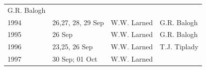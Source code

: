 \documentclass[]{article}
\begin{document}
\begin{longtable}[]{@{}llll@{}}
\begin{minipage}[t]{0.20\columnwidth}
G.R. Balogh\strut
\end{minipage}\tabularnewline
\begin{minipage}[t]{0.12\columnwidth}\raggedright\strut
1994\strut
\end{minipage} & \begin{minipage}[t]{0.38\columnwidth}\raggedright\strut
26,27, 28, 29 Sep\strut
\end{minipage} & \begin{minipage}[t]{0.18\columnwidth}\raggedright\strut
W.W. Larned\strut
\end{minipage} & \begin{minipage}[t]{0.20\columnwidth}\raggedright\strut
G.R. Balogh\strut
\end{minipage}\tabularnewline
\begin{minipage}[t]{0.12\columnwidth}\raggedright\strut
1995\strut
\end{minipage} & \begin{minipage}[t]{0.38\columnwidth}\raggedright\strut
26 Sep\strut
\end{minipage} & \begin{minipage}[t]{0.18\columnwidth}\raggedright\strut
W.W. Larned\strut
\end{minipage} & \begin{minipage}[t]{0.20\columnwidth}\raggedright\strut
G.R. Balogh\strut
\end{minipage}\tabularnewline
\begin{minipage}[t]{0.12\columnwidth}\raggedright\strut
1996\strut
\end{minipage} & \begin{minipage}[t]{0.38\columnwidth}\raggedright\strut
23,25, 26 Sep\strut
\end{minipage} & \begin{minipage}[t]{0.18\columnwidth}\raggedright\strut
W.W. Larned\strut
\end{minipage} & \begin{minipage}[t]{0.20\columnwidth}\raggedright\strut
T.J. Tiplady\strut
\end{minipage}\tabularnewline
\begin{minipage}[t]{0.12\columnwidth}\raggedright\strut
1997\strut
\end{minipage} & \begin{minipage}[t]{0.38\columnwidth}\raggedright\strut
30 Sep; 01 Oct\strut
\end{minipage} & \begin{minipage}[t]{0.18\columnwidth}\raggedright\strut
W.W. Larned\strut

\end{minipage}
\end{longtable}
\end{document}
